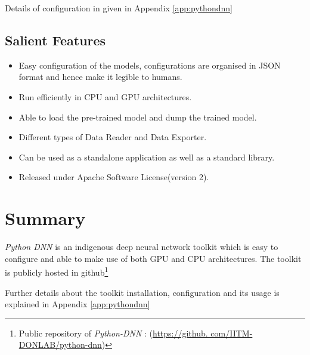 Details of configuration in given in Appendix \ref{app:pythondnn}

\subsection{Salient Features}
\label{sec:python-dnnFeatures}
\begin{itemize}
\item Easy configuration of the models, configurations
are organised in JSON format and  hence make it legible to humans.
\item Run efficiently in CPU and GPU architectures.
\item Able to load the pre-trained model and dump the trained model.
\item Different types of Data Reader and Data Exporter.
\item Can be used as a standalone application as well as a standard  library.
\item Released under Apache Software License(version 2).\\
\end{itemize}

\section{Summary}
\textit{Python DNN} is an indigenous deep neural network toolkit which is easy to configure and able to make use of both GPU and CPU architectures. The toolkit is publicly hosted in github\footnote{Public repository of \textit{Python-DNN} : (\url{https://github. com/IITM-DONLAB/python-dnn})}

Further details about the toolkit installation, configuration and its usage is explained in Appendix \ref{app:pythondnn}
